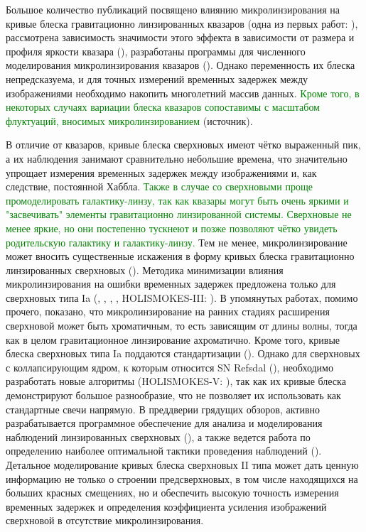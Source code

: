 Большое количество публикаций посвящено влиянию микролинзирования на кривые блеска гравитационно линзированных квазаров (одна из первых работ: \cite{changrefsdal1979}), рассмотрена зависимость значимости этого эффекта в зависимости от размера и профиля яркости квазара (\cite{sizeiseverything}), разработаны программы для численного моделирования микролинзирования квазаров (\cite{wambsganss1992}). Однако переменность их блеска непредсказуема, и для точных измерений временных задержек между изображениями необходимо накопить многолетний массив данных.  \textcolor{green}{Кроме того, в некоторых случаях вариации блеска
квазаров  сопоставимы с масштабом флуктуаций, вносимых микролинзированием} (источник).

В отличие от квазаров, кривые блеска сверхновых имеют чётко выраженный пик, а их наблюдения занимают сравнительно небольшие времена, что значительно упрощает измерения временных задержек между изображениями и, как следствие, постоянной Хаббла. \textcolor{green}{Также в случае со сверхновыми проще промоделировать галактику-линзу, так как квазары могут быть очень яркими и "засвечивать" элементы гравитационно линзированной системы. Сверхновые не менее яркие, но они постепенно тускнеют и позже позволяют чётко увидеть родительскую галактику и галактику-линзу.} Тем не менее, микролинзирование может вносить существенные искажения в форму кривых блеска гравитационно линзированных сверхновых (\cite{doblerkeeton2006}). Методика минимизации влияния микролинзирования на ошибки временных задержек предложена только для сверхновых типа Ia (\cite{moresuyu2017}, \cite{goldstein2018}, \cite{foxleymarrable2018}, \cite{bonvin2019}, HOLISMOKES-III: \cite{holismokesIII}). В упомянутых работах, помимо прочего, показано, что микролинзирование на ранних стадиях расширения сверхновой может быть хроматичным, то есть зависящим от длины волны, тогда как в целом гравитационное линзирование ахроматично. Кроме того, кривые блеска сверхновых типа Ia поддаются стандартизации (\cite{1a_standart}). Однако для сверхновых с коллапсирующим ядром, к которым относится SN Refsdal (\cite{kelly2016}), необходимо разработать новые алгоритмы (HOLISMOKES-V: \cite{holismokesV}), так как их кривые блеска демонстрируют большое разнообразие, что не позволяет их использовать как стандартные свечи напрямую. В преддверии грядущих обзоров, активно  разрабатывается  программное обеспечение для анализа и моделирования наблюдений линзированных сверхновых (\cite{pierelrodney2019}), а также ведется работа по определению наиболее оптимальной тактики проведения наблюдений (\cite{hubersuyu2019}). Детальное моделирование кривых блеска сверхновых II типа может дать ценную информацию не только о строении предсверхновых, в том числе находящихся на больших красных смещениях, но и обеспечить высокую точность измерения временных задержек и определения коэффициента усиления изображений сверхновой в отсутствие микролинзирования.


